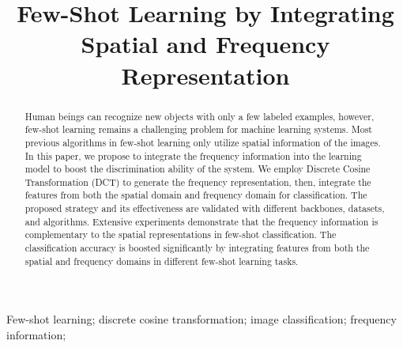 \documentclass[10pt, conference, compsocconf]{IEEEtran}
\begin{document}
\title{Few-Shot Learning by Integrating Spatial and Frequency Representation}




\author{
}













\maketitle


\begin{abstract}
Human beings can recognize new objects with only a few labeled examples, however, few-shot learning remains a challenging problem for machine learning systems. Most previous algorithms in few-shot learning only utilize spatial information of the images. In this paper, we propose to integrate the frequency information into the learning model to boost the discrimination ability of the system. We employ Discrete Cosine Transformation (DCT) to generate the frequency representation, then, integrate the features from both the spatial domain and frequency domain for classification. The proposed strategy and its effectiveness are validated with different backbones, datasets, and algorithms. Extensive experiments demonstrate that the frequency information is complementary to the spatial representations in few-shot classification. The classification accuracy is boosted significantly by integrating features from both the spatial and frequency domains in different few-shot learning tasks. 
\end{abstract}

\begin{IEEEkeywords}
Few-shot learning; discrete cosine transformation; image classification; frequency information;

\end{IEEEkeywords}


\IEEEpeerreviewmaketitle
\end{document}
